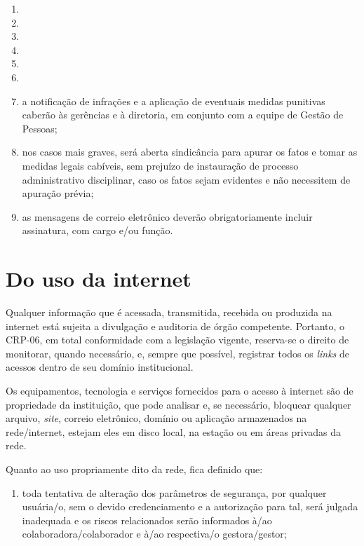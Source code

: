\documentclass[openright, twoside, a4paper]{memoir}
\begin{document}
\begin{enumerate}
    \begin{enumerate}
      \def\labelenumii{\roman{enumii}.}
      \item
      \item
      \item
      \item
      \item
      \item
      \item
            a notificação de infrações e a aplicação de eventuais medidas
            punitivas caberão às gerências e à diretoria, em conjunto com a
            equipe de Gestão de Pessoas;
      \item
            nos casos mais graves, será aberta sindicância para apurar os fatos
            e tomar as medidas legais cabíveis, sem prejuízo de instauração de
            processo administrativo disciplinar, caso os fatos sejam evidentes e
            não necessitem de apuração prévia;
      \item
            as mensagens de correio eletrônico deverão obrigatoriamente incluir
            assinatura, com cargo e/ou função.
    \end{enumerate}
\end{enumerate}

\clearpage\chapter{Do uso da internet}

Qualquer informação que é acessada, transmitida, recebida ou produzida
na internet está sujeita a divulgação e auditoria de órgão competente.
Portanto, o CRP-06, em total conformidade com a legislação vigente,
reserva-se o direito de monitorar, quando necessário, e, sempre que
possível, registrar todos os \emph{links} de acessos dentro de seu
domínio institucional.

Os equipamentos, tecnologia e serviços fornecidos para o acesso à
internet são de propriedade da instituição, que pode analisar e, se
necessário, bloquear qualquer arquivo, \emph{site}, correio eletrônico,
domínio ou aplicação armazenados na rede/internet, estejam eles em disco
local, na estação ou em áreas privadas da rede.

Quanto ao uso propriamente dito da rede, fica definido que:

\begin{enumerate}

\item
    toda tentativa de alteração dos parâmetros de segurança, por qualquer
    usuária/o, sem o devido credenciamento e a autorização para tal, será
    julgada inadequada e os riscos relacionados serão informados à/ao
    colaboradora/colaborador e à/ao respectiva/o gestora/gestor;
\end{enumerate}
\end{document}
